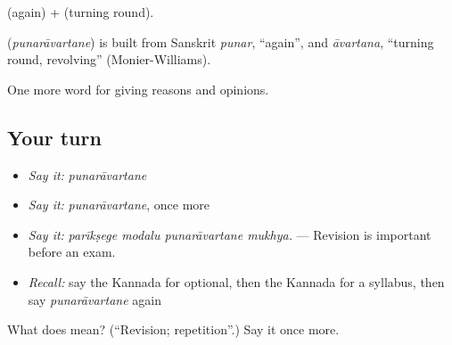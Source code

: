  (again) +  (turning round).

\begin{cousinweb}
\textbf{} (\emph{punarāvartane}) is built from Sanskrit \emph{punar}, \textquotedblleft{}again\textquotedblright{}, and \emph{āvartana}, \textquotedblleft{}turning round, revolving\textquotedblright{} (Monier-Williams).
\end{cousinweb}

\begin{grammarlens}[title={What you've built}]
One more word for giving reasons and opinions.
\end{grammarlens}

\subsection*{Your turn}
\begin{itemize}
\raggedright
  \item \emph{Say it:} \emph{punarāvartane}
  \item \emph{Say it:} \emph{punarāvartane}, once more
  \item \emph{Say it:} \emph{parīkṣege modalu punarāvartane mukhya.} — Revision is important before an exam.
  \item \emph{Recall:} say the Kannada for optional, then the Kannada for a syllabus, then say \emph{punarāvartane} again
\end{itemize}

\begin{tcolorbox}[breakable,colback=teal!4,colframe=teal!35!black,title={Before you move on}]
What does  mean? (\textquotedblleft{}Revision; repetition\textquotedblright{}.) Say it once more.
\end{tcolorbox}
